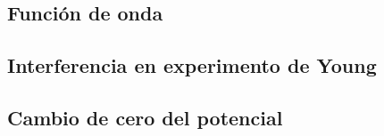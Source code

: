 \documentclass[10pt,oneside]{CBFT_book}
\begin{document}
\subsection{Función de onda}

\subsection{Interferencia en experimento de Young}

\subsection{Cambio de cero del potencial}

% 
% 
% 
% 
\end{document}

